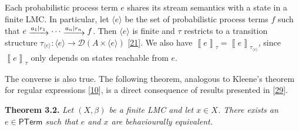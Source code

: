 \par\medskip
\hypertarget{html:S3.SS0.SSS0.Px1.p3}{} Each probabilistic process term %
\hypertarget{html:S3.SS0.SSS0.Px1.p3.m1}{}\({e}\) shares its stream semantics with a state in a finite LMC. In particular, let %
\hypertarget{html:S3.SS0.SSS0.Px1.p3.m2}{}\({\langle e\rangle}\) be the set of probabilistic process terms %
\hypertarget{html:S3.SS0.SSS0.Px1.p3.m3}{}\({f}\) such that %
\hypertarget{html:S3.SS0.SSS0.Px1.p3.m4}{}\({e\mathrel{\raisebox{-2.0pt}{$\xrightarrow{a_{1}\mid r_{1}}$}}\cdots\mathrel{\raisebox{-2.0pt}{$\xrightarrow{a_{n}\mid r_{n}}$}}f}\). Then %
\hypertarget{html:S3.SS0.SSS0.Px1.p3.m5}{}\({\langle e\rangle}\) is finite and %
\hypertarget{html:S3.SS0.SSS0.Px1.p3.m6}{}\({\tau}\) restricts to a transition structure %
\hypertarget{html:S3.SS0.SSS0.Px1.p3.m7}{}\({\tau_{\langle e\rangle}\colon\langle e\rangle\to{\mathcal{D}}(A\times\langle e\rangle)}\) [\hyperlink{html:bib.bib21}{21}]. We also have %
\hypertarget{html:S3.SS0.SSS0.Px1.p3.m8}{}\({\left\llbracket{e}\right\rrbracket_{\tau}=\left\llbracket{e}\right\rrbracket_{\tau_{\langle e\rangle}}}\), since %
\hypertarget{html:S3.SS0.SSS0.Px1.p3.m9}{}\({\left\llbracket{e}\right\rrbracket_{\tau}}\) only depends on states reachable from %
\hypertarget{html:S3.SS0.SSS0.Px1.p3.m10}{}\({e}\).
\par\medskip
\hypertarget{html:S3.SS0.SSS0.Px1.p4}{} The converse is also true. The following theorem, analogous to Kleene’s theorem for regular expressions [\hyperlink{html:bib.bib10}{10}], is a direct consequence of results presented in [\hyperlink{html:bib.bib29}{29}].
\par\medskip
\hypertarget{html:S3.Thmtheorem2}{} \par\noindent\textbf{\textbf{Theorem 3.2}\textbf{.}}\quad  %
\hypertarget{html:S3.Thmtheorem2.p1}{} \emph{Let %
\hypertarget{html:S3.Thmtheorem2.p1.m1}{}\({(X,\beta)}\) be a finite LMC and let %
\hypertarget{html:S3.Thmtheorem2.p1.m2}{}\({x\in X}\). There exists an %
\hypertarget{html:S3.Thmtheorem2.p1.m3}{}\({e\in\mathsf{PTerm}}\) such that %
\hypertarget{html:S3.Thmtheorem2.p1.m4}{}\({e}\) and %
\hypertarget{html:S3.Thmtheorem2.p1.m5}{}\({x}\) are behaviourally equivalent.}

